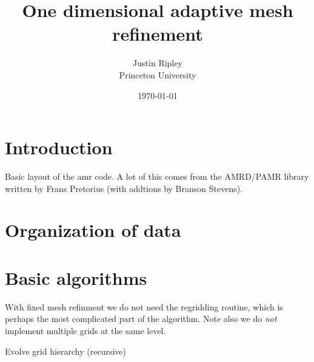 \documentclass[10pt,letter]{article}
\begin{document}
\title{One dimensional adaptive mesh refinement}    
\author{Justin Ripley
	\\Princeton University}
\date{\today}
 
\maketitle 
     
\section{Introduction}
       Basic layout of the amr code. A lot of this comes from the AMRD/PAMR
library written by Frans Pretorius (with addtions by Branson Stevens).  

\section{Organization of data}

\section{Basic algorithms}

	With fixed mesh refinment we do not need the regridding routine,
which is perhaps the most complicated part of the algorithm. Note also
we do \emph{not} implement multiple grids at the same level.

\begin{algorithm}
\caption{Evolve grid hierarchy (recursive)}\label{alg:time_step}
\begin{algorithmic}[1]
			\State{}
		\EndIf 
		\EndIf
		\EndIf
	\EndFor
	\EndIf
\EndProcedure
\end{algorithmic}
\end{algorithm}
\end{document}
